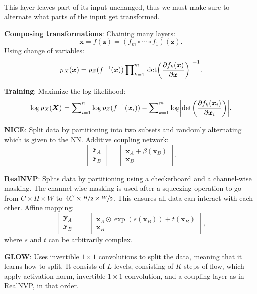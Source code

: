 \documentclass{article}
\newcommand{\lft}{\mathopen{}\mathclose\bgroup\left}
\newcommand{\rgt}{\aftergroup\egroup\right}
\renewcommand{\vec}[1]{\bm{#1}}
\newcommand{\mat}[1]{\bm{#1}}
\newenvironment{topic}[1]
{\textbf{\sffamily \colorbox{black}{\rlap{\textbf{\textcolor{white}{#1}}}\hspace{\linewidth}\hspace{-2\fboxsep}}} \\ \vspace{0.2cm}}
{}
\begin{document}
\begin{multicols*}{2}
\begin{topic}{Normalizing flow}
        This layer leaves part of its input unchanged, thus we must make sure to alternate what parts of
        the input get transformed.

        \textbf{Composing transformations}: Chaining many layers: \[
            \vec{x} = f(\vec{z}) = (f_m \circ \cdots \circ f_1)(\vec{z}).
        \]
        Using change of variables: \[
            p_X(\vec{x}) = p_Z(f^{-1}(\vec{x})) \prod\nolimits_{k=1}^m \lft| \det\lft( \pdv{f_k(\vec{x})}{\vec{x}} \rgt) \rgt|^{-1}.
        \]

        \textbf{Training}: Maximize the log-likelihood: \[
            \log p_{X}(\mat{X}) = \sum\nolimits_{i=1}^{n} \log p_Z(f^{-1}(\vec{x}_i)) - \sum\nolimits_{k=1}^{m} \log \lft| \det\lft( \pdv{f_k(\vec{x}_i)}{\vec{x}_i} \rgt) \rgt|.
        \]

        \textbf{NICE}: Split data by partitioning into two subsets and randomly alternating which is given to the NN. Additive coupling network: \[
            \begin{bmatrix} \vec{y}_A \\ \vec{y}_B \end{bmatrix}
            =
            \begin{bmatrix} \vec{x}_A + \beta(\vec{x}_B) \\ \vec{x}_B \end{bmatrix}.
        \]

        \textbf{RealNVP}: Splits data by partitioning using a checkerboard and a channel-wise
        masking. The channel-wise masking is used after a squeezing operation to go from $C\times H
            \times W$ to $4C \times \nicefrac{H}{2} \times \nicefrac{W}{2}$. This ensures all data can interact with each other. Affine mapping: \[
            \begin{bmatrix} \vec{y}_A \\ \vec{y}_B \end{bmatrix} = \begin{bmatrix} \vec{x}_A \odot \exp(s(\vec{x}_B)) + t(\vec{x}_B) \\ \vec{x}_B \end{bmatrix},
        \]
        where $s$ and $t$ can be arbitrarily complex.

        \textbf{GLOW}: Uses invertible $1\times 1$ convolutions to split the data, meaning that it
        learns how to split. It consists of $L$ levels, consisting of $K$ steps of flow, which apply
        activation norm, invertible $1 \times 1$ convolution, and a coupling layer as in RealNVP, in
        that order.


\end{topic}
\end{multicols*}
\end{document}
